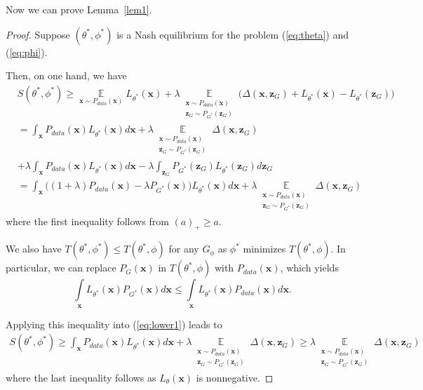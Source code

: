 \documentclass[11pt,fullpage, letterpaper,twoside]{article}
\newcommand{\1}[1]{\mathds{1}_{\left[#1\right]}}
\begin{document}
Now we can prove Lemma~\ref{lem1}.
\begin{proof}
Suppose $(\theta^*,\phi^*)$ is a Nash equilibrium for the problem (\ref{eq:theta}) and (\ref{eq:phi}).

Then, on one hand, we have
\begin{equation}\label{eq:lower1}
\begin{aligned}
&S(\theta^*,\phi^*)\geq\mathop\mathbb E\limits_{\mathbf x\sim P_{data}(\mathbf x)} L_{\theta^*}(\mathbf x)
+ \lambda\mathop\mathbb E\limits_{\substack{\mathbf x\sim P_{data}(\mathbf x)\\ \mathbf z_G\sim P_{G^*}(\mathbf z_G)}} \big(\Delta(\mathbf x, \mathbf z_G)
+L_{\theta^*}(\mathbf x)-L_{\theta^*}(\mathbf z_G)\big)\\
&=\int_\mathbf x P_{data}(\mathbf x) L_{\theta^*}(\mathbf x) d\mathbf x + \lambda \mathop \mathbb E\limits_{\substack{\mathbf x\sim P_{data}(\mathbf x) \\ \mathbf z_G\sim P_{G^*}(\mathbf z_G)}} \Delta(\mathbf x, \mathbf z_G) \\
&+\lambda\int_\mathbf x P_{data}(\mathbf x) L_{\theta^*}(\mathbf x) d\mathbf x - \lambda\int_{\mathbf z_G} P_{G^*}(\mathbf z_G) L_{\theta^*}(\mathbf z_G) d \mathbf z_G\\
&=\int_\mathbf x \big((1+\lambda)P_{data}(\mathbf x)- \lambda P_{G^*}(\mathbf x)\big)L_{\theta^*}(\mathbf x) d\mathbf x +\lambda \mathop \mathbb E\limits_{\substack{\mathbf x\sim P_{data}(\mathbf x) \\ \mathbf z_G\sim P_{G^*}(\mathbf z_G)}}\Delta(\mathbf x, \mathbf z_G)
\end{aligned}
\end{equation}
where the first inequality follows from $(a)_+\geq a$.

We also have $T(\theta^*,\phi^*)\leq T(\theta^*,\phi)$ for any $G_\phi$ as $\phi^*$ minimizes $T(\theta^*,\phi)$. In particular, we can replace $P_G(\mathbf x)$ in $T(\theta^*,\phi)$ with $P_{data}(\mathbf x)$, which yields
$$
\mathop\int\limits_{\mathbf x}L_{\theta^*}(\mathbf x)P_{G^*}(\mathbf x)d\mathbf x \leq
\mathop\int\limits_{\mathbf x}L_{\theta^*}(\mathbf x)P_{data}(\mathbf x)d\mathbf x.
$$

Applying this inequality into (\ref{eq:lower1}) leads to
\begin{equation}\label{eq:lower2}
\begin{aligned}
S(\theta^*,\phi^*)
\geq\int_\mathbf x P_{data}(\mathbf x)L_{\theta^*}(\mathbf x) d\mathbf x
+\lambda \mathop \mathbb E\limits_{\substack{\mathbf x\sim P_{data}(\mathbf x) \\ \mathbf z_G\sim P_{G^*}(\mathbf z_G)}}\Delta(\mathbf x, \mathbf z_G)
\geq\lambda \mathop \mathbb E\limits_{\substack{\mathbf x\sim P_{data}(\mathbf x) \\ \mathbf z_G\sim P_{G^*}(\mathbf z_G)}}\Delta(\mathbf x, \mathbf z_G)
\end{aligned}
\end{equation}
where the last inequality follows as $L_\theta(\mathbf x)$ is nonnegative.






\end{proof}
\end{document}
